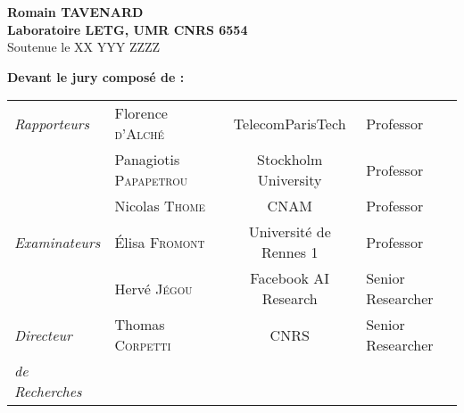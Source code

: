 \begin{titlepage}
\begin{center}
\vspace*{1.5cm}
\noindent \LARGE  \textbf{ Romain T{\Large AVENARD}} \\
\vspace*{1cm}\rmfamily
 \noindent \large \textbf{  Laboratoire LETG, UMR CNRS 6554 } \\
 \vspace*{2cm}
 \noindent \large Soutenue le XX YYY ZZZZ \\
 \vspace*{1cm}
\end{center}
\noindent \large \textbf{Devant le jury composé de :} \\
\begin{center}
\noindent \large
\begin{tabular}{llcl}
      \textit{Rapporteurs}	& Florence {\scshape d'Alché} & TelecomParisTech & Professor\\
                                & Panagiotis {\scshape Papapetrou} & Stockholm University & Professor\\
                                & Nicolas {\scshape Thome} & CNAM & Professor\\
      \textit{Examinateurs}     & Élisa {\scshape Fromont} & Université de Rennes 1 & Professor\\
                                & Hervé {\scshape Jégou} & Facebook AI Research & Senior Researcher\\
      \textit{Directeur}	    & Thomas {\scshape Corpetti} & CNRS & Senior Researcher\\
      \textit{de Recherches}    & & & \\ 

\end{tabular}
 \end{center}
\end{titlepage}
\sloppy

\titlepage

